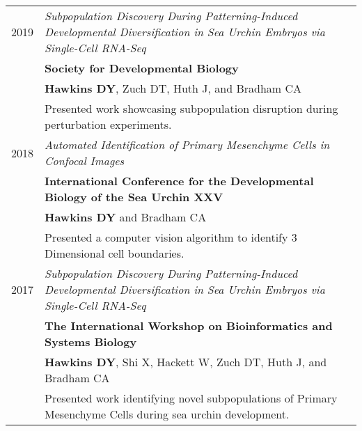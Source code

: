 \documentclass[a4paper,10pt]{report}
\begin{document}
\begin{longtable}{rp{11cm}}
	\textsc{2019} & \emph{Subpopulation Discovery During Patterning-Induced
	Developmental Diversification in Sea Urchin Embryos via Single-Cell RNA-Seq}                                                           \\
	              & \textbf{Society for Developmental Biology}                                                                             \\
	              & \footnotesize \textbf{Hawkins DY}, Zuch DT, Huth J, and Bradham CA                                                     \\
	              & \small{Presented work showcasing subpopulation disruption
	during perturbation experiments.}                                                                                                      \\
	\textsc{2018} & \emph{Automated Identification of Primary Mesenchyme Cells
	in Confocal Images}                                                                                                                    \\
	              & \textbf{International Conference for the Developmental Biology of
	the Sea Urchin XXV}                                                                                                                    \\
	              & \footnotesize \textbf{Hawkins DY} and Bradham CA                                                                       \\
	              & \small{Presented a computer vision algorithm to identify 3
	Dimensional cell boundaries.}                                                                                                          \\
	\textsc{2017} & \emph{Subpopulation Discovery During Patterning-Induced
	Developmental Diversification in Sea Urchin Embryos via Single-Cell RNA-Seq}                                                           \\
	              & \textbf{The International Workshop on Bioinformatics and Systems Biology}                                              \\
	              & \footnotesize \textbf{Hawkins DY}, Shi X, Hackett W, Zuch DT, Huth J, and Bradham CA                                   \\
	              & \small{Presented work identifying novel subpopulations of Primary
	Mesenchyme Cells during sea urchin development.}                                                                                       \\


\end{longtable}
\end{document}
